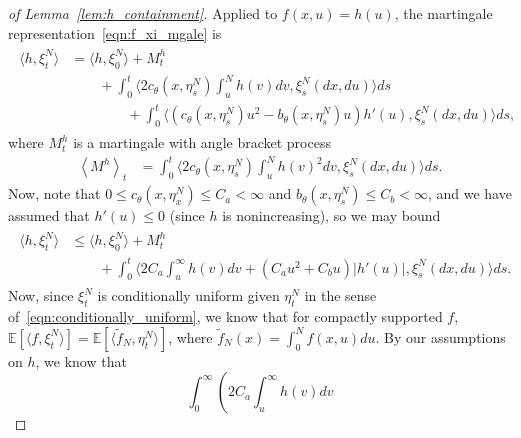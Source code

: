 \documentclass[EJP]{ejpecp} %
\newcommand{\IE}{\mathbb E}
\newcommand{\lp}{\xi}              %
\begin{document}
\begin{proof}[of Lemma~\ref{lem:h_containment}]
    Applied to $f(x, u) = h(u)$, the martingale representation~\eqref{eqn:f_xi_mgale} is
    \begin{align*}
    \begin{split}
        \langle h, \lp_t^N \rangle
        &=
        \langle h, \lp_0^N \rangle
        + M^{h}_t 
        \\ & \qquad {}
        +
        \int_0^t
        \big\langle
            2 c_\theta(x, \eta^N_s) \int_u^N h(v) dv
        ,
        \lp_s^N(dx, du) \big \rangle
        ds
        \\ & \qquad \qquad {}
        +
        \int_0^t
        \big\langle
            \left(
                c_\theta(x, \eta^N_s) u^2
                - b_\theta(x, \eta^N_s) u
            \right)
            h'(u)
        ,
        \lp_s^N(dx, du) \big \rangle
        ds ,
    \end{split}
    \end{align*}
    where $M^{h}_t$ is a martingale
    with angle bracket process
    \begin{align*}
        \left\langle M^{h} \right\rangle_t
        &=
        \int_0^t
        \langle 2 c_\theta(x, \eta_s^N) \int_u^N h(v)^2 dv
        ,
        \lp_s^N(dx, du) \big \rangle
        ds .
    \end{align*}
    Now, note that $0 \le c_\theta(x, \eta_x^N) \le C_a < \infty$
    and $b_\theta(x, \eta_s^N) \le C_b < \infty$,
    and we have assumed that $h'(u) \le 0$ (since $h$ is nonincreasing),
    so we may bound
    \begin{align} \label{eqn:hn_bound}
    \begin{split} 
        \langle h, \lp_t^N \rangle
        &\le
        \langle h, \lp_0^N \rangle
        + M^{h}_t
        \\ & \qquad {}
        +
        \int_0^t
        \big\langle
            2 C_a \int_u^\infty h(v) dv
            + \left( C_a u^2 + C_b u \right) |h'(u)|,
        \lp_s^N(dx, du) \big \rangle
        ds .
    \end{split}
    \end{align}
    Now, since $\lp_t^N$ is conditionally uniform given $\eta_t^N$
    in the sense of~\eqref{eqn:conditionally_uniform},
    we know that for compactly supported $f$,
    $\IE[\langle f, \lp^N_t \rangle] = \IE[\langle \widetilde{f}_N, \eta^N_t \rangle]$,
    where $\widetilde{f}_N(x) = \int_0^N f(x,u) du$.
    By our assumptions on $h$,
    we know that
    $$
        \int_0^\infty \left( 2 C_a \int_u^\infty h(v) dv
$$
\end{proof}
\end{document}

